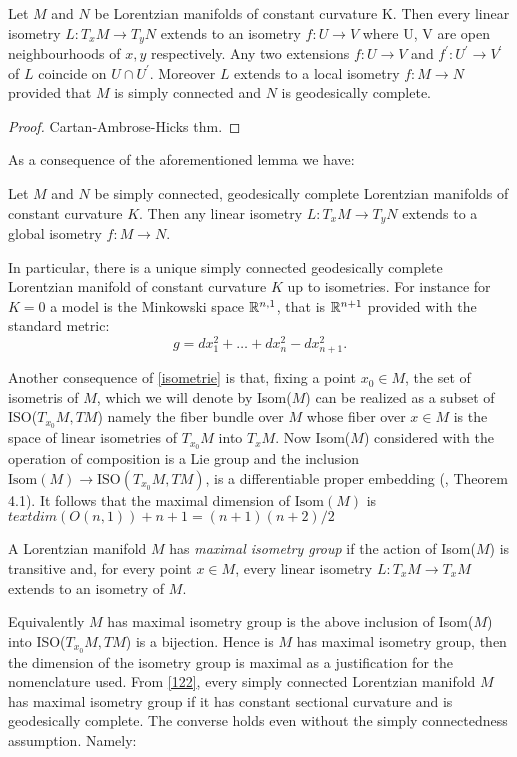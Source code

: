 \begin{lemma}\label{isometrie} Let $M$ and $N$ be Lorentzian manifolds of constant curvature K. Then every linear isometry $L:T_{x}M\to T_yN$ extends to an isometry $f:U\to V$ where U, V are open neighbourhoods of $x, y$ respectively. Any two extensions $f:U\to V$ and $f^{\prime}:U^{\prime} \to V^{\prime} $ of $L$ coincide on $U\cap U^{\prime}. $ Moreover $L$ extends to a local isometry $f:M\to N$ provided that $M$ is simply connected and $N$ is geodesically complete. 
\end{lemma}
\begin{proof}
    Cartan-Ambrose-Hicks thm.
\end{proof}
As a consequence of the aforementioned lemma we have: 
\begin{corollary}\label{122}
    Let $M$ and $N$ be simply connected, geodesically complete Lorentzian manifolds of constant curvature $K$. Then any linear isometry $L:T_xM\to T_yN$ extends to a global isometry $f:M\to N.$   
\end{corollary}

In particular, there is a unique simply connected geodesically complete Lorentzian manifold of constant curvature $K$ up to isometries. For instance for $K=0$ a model is the Minkowski space $\mathbb{R}^{n,1}$, that is $\mathbb{R}^{n+1}$ provided with the standard metric: 
\[
    g=dx_1^{2}+\dots+dx_n^{2}-dx_{n+1}^2.   
\]

Another consequence of \ref{isometrie} is that, fixing a point $x_0 \in M$, the set of isometris of $M$, which we will denote by Isom($M$) can be realized as a subset of ISO($T_{x_0}M, TM$) namely the fiber bundle over $M$ whose fiber over $x\in M$ is the space of linear isometries of $T_{x_0}M$ into $T_{x}M$. Now Isom($M$) considered with the operation of composition is a Lie group and the inclusion $\text{Isom}(M)\to \text{ISO}(T_{x_0}M, TM)$, is a differentiable proper embedding (\cite{okubo_1970}, Theorem 4.1). It follows that the maximal dimension of $\text{Isom}(M)$ is $text{dim}(O(n,1))+n+1=(n+1)(n+2)/2$

\begin{definition}
    A Lorentzian manifold $M$ has \textit{maximal isometry group} if the action of Isom($M$) is transitive and, for every point $x \in M$, every linear isometry $L:T_{x}M\to T_xM$ extends to an isometry of $M$. 
\end{definition}

Equivalently $M$ has maximal isometry group is the above inclusion of Isom($M$) into ISO($T_{x_0}M, TM$) is a bijection. Hence is $M$ has maximal isometry group, then the dimension of the isometry group is maximal as a justification for the nomenclature used. 
From \ref{122}, every simply connected Lorentzian manifold $M$ has maximal isometry group if it has constant sectional curvature and is geodesically complete. The converse holds even without the simply connectedness assumption. Namely: 

